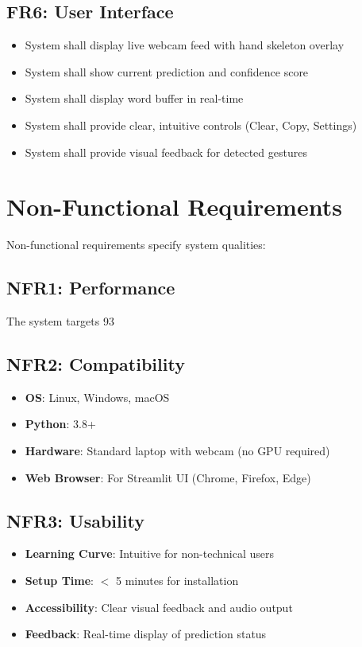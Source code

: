 \subsection{FR6: User Interface}
\begin{itemize}
    \item System shall display live webcam feed with hand skeleton overlay
    \item System shall show current prediction and confidence score
    \item System shall display word buffer in real-time
    \item System shall provide clear, intuitive controls (Clear, Copy, Settings)
    \item System shall provide visual feedback for detected gestures
\end{itemize}

\vspace{1em}
\section{Non-Functional Requirements}

Non-functional requirements specify system qualities:

\subsection{NFR1: Performance}

The system targets 93%

\subsection{NFR2: Compatibility}
\begin{itemize}
    \item \textbf{OS}: Linux, Windows, macOS
    \item \textbf{Python}: 3.8+
    \item \textbf{Hardware}: Standard laptop with webcam (no GPU required)
    \item \textbf{Web Browser}: For Streamlit UI (Chrome, Firefox, Edge)
\end{itemize}

\subsection{NFR3: Usability}
\begin{itemize}
    \item \textbf{Learning Curve}: Intuitive for non-technical users
    \item \textbf{Setup Time}: $<$ 5 minutes for installation
    \item \textbf{Accessibility}: Clear visual feedback and audio output
    \item \textbf{Feedback}: Real-time display of prediction status
\end{itemize}

